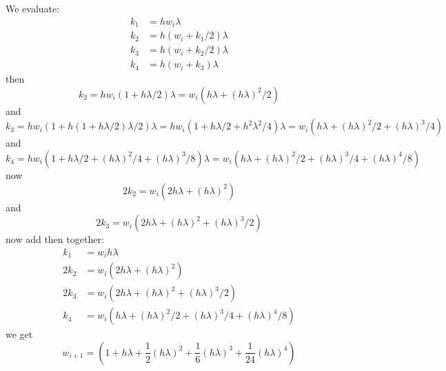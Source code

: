 \documentclass{article}
\begin{document}
    \begin{answer}
        We evaluate:
            \begin{align*}
                k_{1} &= hw_{i}\lambda               \\
                k_{2} &= h(w_{i} + k_{1} / 2)\lambda \\
                k_{3} &= h(w_{i} + k_{2} / 2)\lambda \\
                k_{4} &= h(w_{i} + k_{3})\lambda       
            \end{align*}
        then
            \begin{equation*}
                k_{2} = hw_{i}(1 + h\lambda / 2)\lambda = w_{i}(h\lambda + (h\lambda)^{2} / 2)
            \end{equation*}
        and
            \begin{equation*}
                k_{3} = hw_{i}(1 + h(1 + h\lambda/2)\lambda/2)\lambda = hw_{i}(1 + h\lambda/2 + h^{2}\lambda^{2}/4)\lambda = w_{i}(h\lambda + (h\lambda)^{2} / 2 + (h\lambda)^{3}/4)
            \end{equation*}
        and
            \begin{equation*}
                k_{4} = hw_{i}(1 + h\lambda / 2+ (h\lambda)^{2} / 4 + (h\lambda)^{3} / 8)\lambda = w_{i}(h\lambda + (h\lambda)^{2} / 2 +  (h\lambda)^{3} / 4 + (h\lambda)^{4} / 8)
            \end{equation*}
        now
            \begin{equation*}
                2k_{2} = w_{i}(2h\lambda + (h\lambda)^{2})
            \end{equation*}
        and
            \begin{equation*}
                2k_{3} = w_{i}(2h\lambda + (h\lambda)^{2} + (h\lambda)^{3} / 2)
            \end{equation*}
        now add then together:
            \begin{align*}
                k_{1}  &= w_{i}h\lambda                                                                \\
                2k_{2} &= w_{i}(2h\lambda + (h\lambda)^{2})                                            \\
                2k_{3} &= w_{i}(2h\lambda + (h\lambda)^{2} + (h\lambda)^{3} / 2)                       \\
                k_{4}  &= w_{i}(h\lambda + (h\lambda)^{2} /2 + (h\lambda)^{3} / 4 + (h\lambda)^{4}/8)    
            \end{align*}
        we get
            \begin{equation*}
                w_{i + 1} = \left(1 + h\lambda + \dfrac{1}{2}(h\lambda)^{2} + \dfrac{1}{6}(h\lambda)^{3} + \dfrac{1}{24}(h\lambda)^{4}\right)
            \end{equation*}

    \end{answer}
\end{document}
